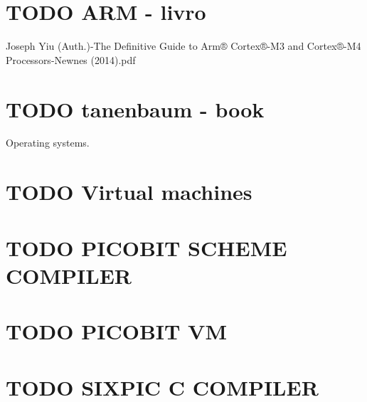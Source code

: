 \documentclass[11pt]{article}
\begin{document}
\section{{\bfseries\sffamily TODO} ARM - livro}
\label{sec-8}

Joseph Yiu (Auth.)-The Definitive Guide to Arm® Cortex®-M3 and Cortex®-M4 Processors-Newnes (2014).pdf

\section{{\bfseries\sffamily TODO} tanenbaum - book}
\label{sec-9}

Operating systems.

\section{{\bfseries\sffamily TODO} Virtual machines}
\label{sec-10}

\section{{\bfseries\sffamily TODO} PICOBIT SCHEME COMPILER}
\label{sec-11}

\section{{\bfseries\sffamily TODO} PICOBIT VM}
\label{sec-12}

\section{{\bfseries\sffamily TODO} SIXPIC C COMPILER}
\label{sec-13}
\end{document}
